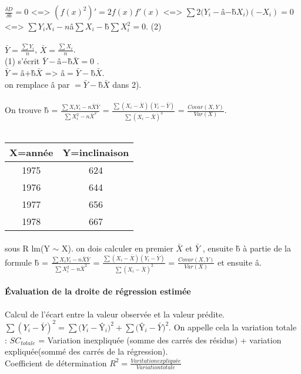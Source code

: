 \documentclass{article}
\begin{document}
$\frac{\delta D}{\delta b} = 0$ <=> $(f(x)^2)' = 2f(x)f'(x)$ <=> $\sum 2(Y_i-$\^a$-$\^b$X_i)(-X_i) = 0$ <=> $\sum Y_iX_i - n$\^a$\sum X_i-$\^b$\sum X_i^2=0$. (2)\\\\

$\bar{Y} = \frac{ \sum Y_i}{n}$, $\bar{X} = \frac{\sum X_i}{n}$.\\
(1) s'écrit $\bar{Y}-$\^a$-$\^b$\bar{X}=0$ .\\
$\bar{Y}=$\^a$+$\^b$\bar{X}$ => \^a$=\bar{Y}-$\^b$\bar{X}$.\\on remplace \^a par  $=\bar{Y}-$\^b$\bar{X}$ dans 2).\\\\On trouve \^b = $\frac{\sum X_iY_i-n\bar{X}\bar{Y}}{\sum X_i^2 -n\bar{X}^2} $ = $\frac{\sum (X_i-\bar{X})(Y_i-\bar{Y})}{\sum (X_i -\bar{X})^2} $ = $\frac{Covar(X,Y)}{Var(X)}$.\\\\

\begin{tabular}{|c|c|}
\hline
X=année & Y=inclinaison \\ \hline
1975 & 624 \\ \hline
1976 & 644 \\ \hline
1977 & 656 \\ \hline
1978 & 667 \\\hline
\end{tabular}
\paragraph{} sous R lm(Y $\sim$ X). on dois calculer en premier $\bar{X}$ et $\bar{Y}$ , ensuite  \^b à partie de la formule \^b = $\frac{\sum X_iY_i-n\bar{X}\bar{Y}}{\sum X_i^2 -n\bar{X}^2} $ = $\frac{\sum (X_i-\bar{X})(Y_i-\bar{Y})}{\sum (X_i -\bar{X})^2} $ = $\frac{Covar(X,Y)}{Var(X)}$ et ensuite \^a.
\paragraph{Évaluation de la droite de régression estimée} Calcul de l'écart entre la valeur observée et la valeur prédite.\\$\sum (Y_i-\bar{Y})^2 = \sum (Y_i-$\^Y$_i)^2+ \sum($\^Y$_i-\bar{Y})^2$. On appelle cela la variation totale : $SC_{totale}$  =  Variation inexpliquée (somme des carrés des résidus) + variation expliquée(sommé des carrés de la régression).\\Coefficient de détermination $R^2 = \frac{Varitation expliquée}{Variation totale}$ 

 
\end{document}
